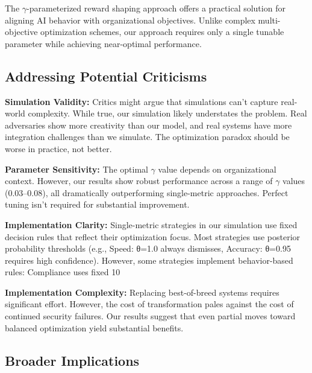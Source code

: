 \documentclass[10pt,conference]{IEEEtran}
\begin{document}
The $\gamma$-parameterized reward shaping approach offers a practical solution for aligning AI behavior with organizational objectives. Unlike complex multi-objective optimization schemes, our approach requires only a single tunable parameter while achieving near-optimal performance.

\subsection{Addressing Potential Criticisms}

\textbf{Simulation Validity:} Critics might argue that simulations can't capture real-world complexity. While true, our simulation likely understates the problem. Real adversaries show more creativity than our model, and real systems have more integration challenges than we simulate. The optimization paradox should be worse in practice, not better.

\textbf{Parameter Sensitivity:} The optimal $\gamma$ value depends on organizational context. However, our results show robust performance across a range of $\gamma$ values (0.03--0.08), all dramatically outperforming single-metric approaches. Perfect tuning isn't required for substantial improvement.

\textbf{Implementation Clarity:} Single-metric strategies in our simulation use fixed decision rules that reflect their optimization focus. Most strategies use posterior probability thresholds (e.g., Speed: θ=1.0 always dismisses, Accuracy: θ=0.95 requires high confidence). However, some strategies implement behavior-based rules: Compliance uses fixed 10%

\textbf{Implementation Complexity:} Replacing best-of-breed systems requires significant effort. However, the cost of transformation pales against the cost of continued security failures. Our results suggest that even partial moves toward balanced optimization yield substantial benefits.

\subsection{Broader Implications}
\end{document}
